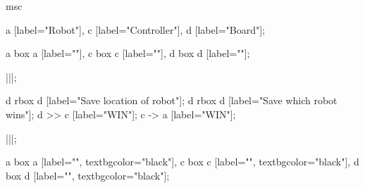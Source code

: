 \begin{msc}
msc
{

a [label="Robot"],
c [label="Controller"],
d [label="Board"];

a box a [label=""],
c box c [label=""],
d box d [label=""];

|||;

d rbox d [label="Save location of robot"];
d rbox d [label="Save which robot wins"];
d >> c [label="WIN"];
c -> a [label="WIN"];

|||;

a box a [label="", textbgcolor="black"],
c box c [label="", textbgcolor="black"],
d box d [label="", textbgcolor="black"];

}
\end{msc}
